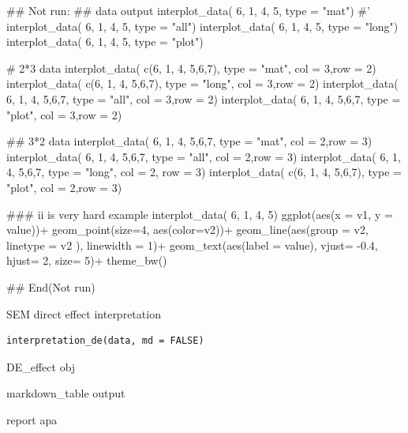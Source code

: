 \documentclass[a4paper]{book}
\begin{document}
\begin{Examples}
\begin{ExampleCode}
\#\# Not run: 
 ## data output
interplot_data( 6, 1, 4, 5, type = "mat")
#' interplot_data( 6, 1, 4, 5, type = "all")
interplot_data( 6, 1, 4, 5, type = "long")
interplot_data( 6, 1, 4, 5, type = "plot")

# 2*3 data
interplot_data( c(6, 1, 4, 5,6,7), type = "mat",  col = 3,row = 2)
interplot_data( c(6, 1, 4, 5,6,7), type = "long",  col = 3,row = 2)
interplot_data( 6, 1, 4, 5,6,7, type = "all",  col = 3,row = 2)
interplot_data( 6, 1, 4, 5,6,7, type = "plot",  col = 3,row = 2)

## 3*2 data
interplot_data( 6, 1, 4, 5,6,7, type = "mat",  col = 2,row = 3)
interplot_data( 6, 1, 4, 5,6,7, type = "all",  col = 2,row = 3)
interplot_data( 6, 1, 4, 5,6,7, type = "long",  col = 2, row = 3)
interplot_data( c(6, 1, 4, 5,6,7), type = "plot",  col = 2,row = 3)

### ii is very hard example
interplot_data( 6, 1, 4, 5) %
ggplot(aes(x = v1, y = value))+
geom_point(size=4, aes(color=v2))+
geom_line(aes(group = v2, linetype = v2 ), linewidth = 1)+
geom_text(aes(label = value), vjust= -0.4, hjust= 2, size= 5)+
theme_bw()


## End(Not run)
\end{ExampleCode}
\end{Examples}
%
\begin{Description}
SEM direct effect interpretation
\end{Description}
%
\begin{Usage}
\begin{verbatim}
interpretation_de(data, md = FALSE)
\end{verbatim}
\end{Usage}
%
\begin{Arguments}
\begin{ldescription}
\item[\code{data}] DE\_effect obj

\item[\code{md}] markdown\_table output
\end{ldescription}
\end{Arguments}
%
\begin{Value}
report apa
\end{Value}
%
\end{document}
